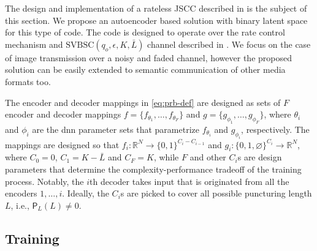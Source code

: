 The design and implementation of a rateless JSCC described in  is the subject of this section. We propose an autoencoder based solution with binary latent space for this type of code. The code is designed to operate over the  rate control mechanism  and $\text{SVBSC}(q_o,\epsilon, K, \bar{L})$ channel described in . We focus on the case of image transmission over a noisy and faded channel, however the proposed solution can be easily extended to semantic communication of other media formats too.


The encoder and decoder mappings  in \eqref{eq:prb-def} are designed as sets of $F$ encoder and decoder mappings $f = \{f_{\theta_1},\ldots, f_{\theta_F} \}$ and $g = \{g_{\phi_1},\ldots, g_{\phi_F} \}$, where $\theta_i$ and $\phi_i$ are  the \gls{dnn} parameter sets that parametrize $f_{\theta_i}$ and $g_{\phi_i}$, respectively. The mappings are designed so that $f_i: \mathbb{R}^N\rightarrow \{0,1\}^{C_i - C_{i-1}}$ and $g_i: \{0,1,\varnothing\}^{C_i} \rightarrow \mathbb{R}^N$, where  $C_0=0$,   $C_1 = K - \bar{L}$ and $C_F = K$, while $F$ and other $C_i$s are design parameters that determine the complexity-performance tradeoff of the training process. Notably, the $i$th decoder takes input that is originated from all the encoders $1,\ldots,i$. Ideally, the $C_i$s are picked to cover all possible puncturing length $L$, i.e., $\mathsf{P}_L(L) \neq 0$.





\subsection{Training}

